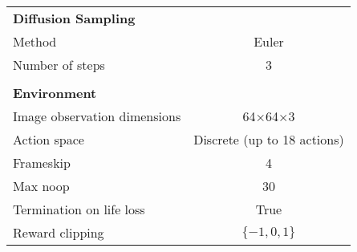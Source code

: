 \begin{table}[h!]
\begin{center}
\begin{tabular}{ l c }
\\
\multicolumn{2}{l}{\textbf{Diffusion Sampling}} \\
Method &  Euler \\
Number of steps & 3 \\

\\
\multicolumn{2}{l}{\textbf{Environment}} \\
Image observation dimensions & 64$\times$64$\times$3 \\
Action space & Discrete (up to 18 actions) \\
Frameskip & 4 \\
Max noop & 30 \\
Termination on life loss & True \\
Reward clipping & $\{-1, 0, 1\}$ \\

\end{tabular}
\end{center}
\end{table}
